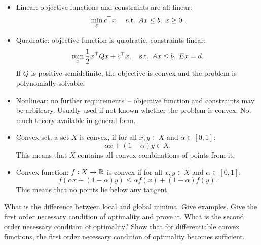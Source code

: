 \documentclass{article}
\begin{document}
\begin{itemize}
\item Linear: objective functions and constraints are all linear:
  \begin{equation*}
    \min_x c^{\top} x, \quad\text{s.t. } Ax \leq b,\; x \geq 0.
  \end{equation*}
\item Quadratic: objective function is quadratic, constraints linear:
  \begin{equation*}
    \min_x \frac{1}{2}x^{\top} Q x + c^{\top} x, \quad\text{s.t. } Ax \leq b,\; Ex = d.
  \end{equation*}
  If \(Q\) is positive semidefinite, the objective is convex and the problem is polynomially
  solvable.
\item Nonlinear: no further requirements~-- objective function and constraints may be
  arbitrary.  Usually used if not known whether the problem is convex.  Not much theory available in
  general form.
\item Convex set: a set \(X\) is convex, if for all \(x, y \in X\) and
  \(\alpha \in [0,1]\):
  \begin{equation*}
    \alpha x + (1 - \alpha) y \in X.
  \end{equation*}
  This means that \(X\) contains all convex combinations of points from it.
\item Convex function: \(f: X \to \mathbb{R}\) is convex if for all \(x, y \in X\) and
  \(\alpha \in [0,1]\):
  \begin{equation*}
    f(\alpha x + (1 - \alpha) y) \leq \alpha f(x) + (1 - \alpha) f(y).
  \end{equation*}
  This means that no points lie below any tangent.
\end{itemize}

\begin{question}
  What is the difference between local and global minima. Give examples.  Give the first order
  necessary condition of optimality and prove it. What is the second order necessary condition of
  optimality? Show that for differentiable convex functions, the first order necessary condition of
  optimality becomes sufficient.
\end{question}
\end{document}
